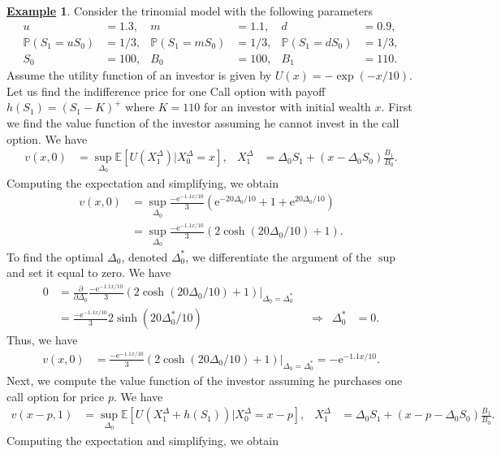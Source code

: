 \documentclass[12pt]{book}
\numberwithin{equation}{chapter}
\theoremstyle{plain}
\numberwithin{theorem}{section}
\theoremstyle{definition}
\newtheorem{example}[theorem]{\underline{Example}}
\numberwithin{exercise}{chapter}
\newcommand{\<}{\langle}
\renewcommand{\>}{\rangle}
\renewcommand{\(}{\left(}
\renewcommand{\)}{\right)}
\renewcommand{\[}{\left[}
\renewcommand{\]}{\right]}
\newcommand\Eb{\mathds{E}}
\newcommand\Pb{\mathds{P}}
\newcommand\Del{\Delta}
\renewcommand\d{\partial}
\newcommand\ee{\mathrm{e}}
\theoremstyle{definition}
\numberwithin{question}{section}
\begin{document}
\begin{example}
Consider the trinomial model with the following parameters
\begin{align}
u
	&=	1.3, &
m
	&=	1.1, &
d
	&=	0.9 , \\
\Pb( S_1 = u S_0 )
	&=	1/3, &
\Pb( S_1 = m S_0 )
	&=	1/3, &
\Pb( S_1 = d S_0 )
	&=	1/3 , \\
S_0
	&=	100 , &
B_0
	&=	100 , &
B_1
	&=	110 .
\end{align}
Assume the utility function of an investor is given by $U(x) = - \exp( - x/10 )$.
Let us find the indifference price for one Call option with payoff $h(S_1) = (S_1 - K)^+$ where $K = 110$ for an investor with initial wealth $x$.  First we find the value function of the investor assuming he cannot invest in the call option.   We have
\begin{align}
v(x,0)
	&=	\sup_{\Del_0} \Eb [ U(X_1^\Del) | X_0^\Del = x ], &
X_1^\Del
	&=	\Del_0 S_1 + (x - \Del_0 S_0) \frac{B_1}{B_0} .
\end{align}
Computing the expectation  and simplifying, we obtain
\begin{align}
v(x,0)
	&=	\sup_{\Del_0} \frac{-\ee^{-1.1x/10}}{3} \( \ee^{ -20 \Del_0 / 10 } + 1 + \ee^{ 20 \Del_0 / 10 } \) \\
	&=	\sup_{\Del_0} \frac{-\ee^{-1.1x/10}}{3} \( 2 \cosh ( 20 \Del_0 / 10 ) + 1  \) .
\end{align}
To find the optimal $\Del_0$, denoted $\Del_0^*$, we differentiate the argument of the $\sup$ and set it equal to zero.  We have
\begin{align}
0
	&=	\frac{\d}{\d \Del_0} \frac{-\ee^{-1.1x/10}}{3} \( 2 \cosh ( 20 \Del_0 / 10 ) + 1  \) \Big|_{\Del_0=\Del_0^*} \\
	&=	\frac{-\ee^{-1.1x/10}}{3} 2 \sinh ( 20 \Del_0^* / 10 )  &
	&\Rightarrow&
\Del_0^*
	&=	0 .
\end{align}
Thus, we have
\begin{align}
v(x,0)
	&=	\frac{-\ee^{-1.1x/10}}{3} \( 2 \cosh ( 20 \Del_0 / 10 ) + 1  \) \Big|_{\Del_0=\Del_0^*}
	=		-\ee^{-1.1x/10} .
\end{align}
Next, we compute the value function of the investor assuming he purchases one call option for price $p$.  We have
\begin{align}
v(x-p,1)
	&=	\sup_{\Del_0} \Eb [ U(X_1^\Del + h(S_1)) | X_0^\Del = x - p ] , &
X_1^\Del
	&=	\Del_0 S_1 + (x - p - \Del_0 S_0) \frac{B_1}{B_0} .
\end{align}
Computing the expectation and simplifying, we obtain
\begin{align}

\end{align}
\end{example}
\end{document}
